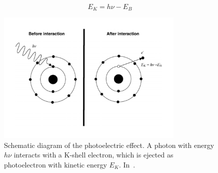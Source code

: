 \begin{equation}
E_K = h\nu - E_B
\label{chap2::eq::energyPhotoelectron}
\end{equation}

\begin{figure}[!htbp]
\centering
\includegraphics[width=0.8\textwidth]{03_GraphicFiles/chapter2_GammaCameras/photoelectric_abs.pdf}
\caption{Schematic diagram of the photoelectric effect. A photon with energy $h \nu$ interacts with a K-shell electron, which is ejected as photoelectron with kinetic energy $E_K$. In~\cite{Podgorsak2010}.}
\label{chap2::fig::photoel_abs}
\end{figure} 

